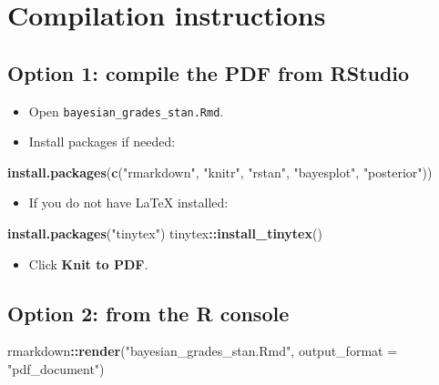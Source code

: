 \documentclass[
  12pt,
]{article}
\newenvironment{Shaded}{\begin{snugshade}}{\end{snugshade}}
\newcommand{\AttributeTok}[1]{\textcolor[rgb]{0.13,0.29,0.53}{#1}}
\newcommand{\FunctionTok}[1]{\textcolor[rgb]{0.13,0.29,0.53}{\textbf{#1}}}
\newcommand{\NormalTok}[1]{#1}
\newcommand{\SpecialCharTok}[1]{\textcolor[rgb]{0.81,0.36,0.00}{\textbf{#1}}}
\newcommand{\StringTok}[1]{\textcolor[rgb]{0.31,0.60,0.02}{#1}}
\providecommand{\tightlist}{%
  \setlength{\itemsep}{0pt}\setlength{\parskip}{0pt}}
\begin{document}
\section{Compilation instructions}\label{compilation-instructions}

\subsection{Option 1: compile the PDF from
RStudio}\label{option-1-compile-the-pdf-from-rstudio}

\begin{itemize}
\tightlist
\item
  Open \texttt{bayesian\_grades\_stan.Rmd}.
\item
  Install packages if needed:
\end{itemize}

\begin{Shaded}
\begin{Highlighting}[]
\FunctionTok{install.packages}\NormalTok{(}\FunctionTok{c}\NormalTok{(}\StringTok{"rmarkdown"}\NormalTok{, }\StringTok{"knitr"}\NormalTok{, }\StringTok{"rstan"}\NormalTok{, }\StringTok{"bayesplot"}\NormalTok{, }\StringTok{"posterior"}\NormalTok{))}
\end{Highlighting}
\end{Shaded}

\begin{itemize}
\tightlist
\item
  If you do not have LaTeX installed:
\end{itemize}

\begin{Shaded}
\begin{Highlighting}[]
\FunctionTok{install.packages}\NormalTok{(}\StringTok{"tinytex"}\NormalTok{)}
\NormalTok{tinytex}\SpecialCharTok{::}\FunctionTok{install\_tinytex}\NormalTok{()}
\end{Highlighting}
\end{Shaded}

\begin{itemize}
\tightlist
\item
  Click \textbf{Knit to PDF}.
\end{itemize}

\subsection{Option 2: from the R
console}\label{option-2-from-the-r-console}

\begin{Shaded}
\begin{Highlighting}[]
\NormalTok{rmarkdown}\SpecialCharTok{::}\FunctionTok{render}\NormalTok{(}\StringTok{"bayesian\_grades\_stan.Rmd"}\NormalTok{, }\AttributeTok{output\_format =} \StringTok{"pdf\_document"}\NormalTok{)}
\end{Highlighting}
\end{Shaded}
\end{document}
